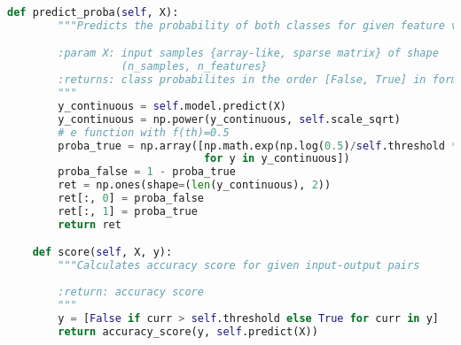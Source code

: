 \begin{lstlisting}[language=Python, basicstyle=\scriptsize, tabsize=4]
    def predict_proba(self, X):
        """Predicts the probability of both classes for given feature vectors

        :param X: input samples {array-like, sparse matrix} of shape
        		  (n_samples, n_features}
        :returns: class probabilites in the order [False, True] in form (n_samples,2)
        """
        y_continuous = self.model.predict(X)
        y_continuous = np.power(y_continuous, self.scale_sqrt)
        # e function with f(th)=0.5
        proba_true = np.array([np.math.exp(np.log(0.5)/self.threshold * y)
        					   for y in y_continuous])
        proba_false = 1 - proba_true
        ret = np.ones(shape=(len(y_continuous), 2))
        ret[:, 0] = proba_false
        ret[:, 1] = proba_true
        return ret

    def score(self, X, y):
        """Calculates accuracy score for given input-output pairs
        
        :return: accuracy score
        """
        y = [False if curr > self.threshold else True for curr in y]
        return accuracy_score(y, self.predict(X))
\end{lstlisting}
